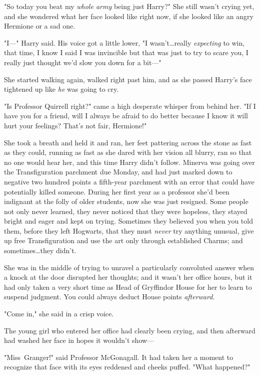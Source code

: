 "So today you beat my \emph{whole army} being just Harry?" She still wasn't
crying yet, and she wondered what her face looked like right now, if she looked
like an angry Hermione or a sad one.

"I---" Harry said. His voice got a little lower, "I wasn't…really
\emph{expecting} to win, that time, I know I said I was invincible but that was
just to try to scare you, I really just thought we'd slow you down for a bit---"

She started walking again, walked right past him, and as she passed Harry's
face tightened up like \emph{he} was going to cry.

"Is Professor Quirrell right?" came a high desperate whisper from behind her.
"If I have you for a friend, will I always be afraid to do better because I
know it will hurt your feelings? That's not fair, Hermione!"

She took a breath and held it and ran, her feet pattering across the stone as
fast as they could, running as fast as she dared with her vision all blurry,
ran so that no one would hear her, and this time Harry didn't follow.
\later
Minerva was going over the Transfiguration parchment due Monday, and had just
marked down to negative two hundred points a fifth-year parchment with an error
that could have potentially killed someone. During her first year as a
professor she'd been indignant at the folly of older students, now she was just
resigned. Some people not only never learned, they never noticed that they were
hopeless, they stayed bright and eager and kept on trying. Sometimes they
believed you when you told them, before they left Hogwarts, that they must
\emph{never} try anything unusual, give up free Transfiguration and use the art
only through established Charms; and sometimes…they didn't.

She was in the middle of trying to unravel a particularly convoluted answer
when a knock at the door disrupted her thoughts; and it wasn't her office
hours, but it had only taken a very short time as Head of Gryffindor House for
her to learn to suspend judgment. You could always deduct House points
\emph{afterward.}

"Come in," she said in a crisp voice.

The young girl who entered her office had clearly been crying, and then
afterward had washed her face in hopes it wouldn't show---

"Miss~Granger!" said Professor McGonagall. It had taken her a moment to
recognize that face with its eyes reddened and cheeks puffed. "What happened?"

